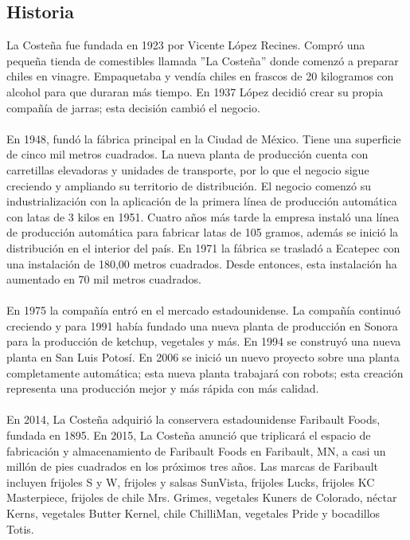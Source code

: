 \documentclass[12pt,letterpaper]{article}
\begin{document}
\subsection{Historia}
La Costeña fue fundada en 1923 por Vicente López Recines. Compró una pequeña tienda de comestibles llamada ''La Costeña'' donde 
comenzó a preparar chiles en vinagre. Empaquetaba y vendía chiles en frascos de 20 kilogramos con alcohol para que duraran más 
tiempo. En 1937 López decidió crear su propia compañía de jarras; esta decisión cambió el negocio. 
\\ \\
En 1948, fundó la fábrica principal en la Ciudad de México. Tiene una superficie de cinco mil metros cuadrados. La nueva planta 
de producción cuenta con carretillas elevadoras y unidades de transporte, por lo que el negocio sigue creciendo y ampliando su 
territorio de distribución. El negocio comenzó su industrialización con la aplicación de la primera línea de producción automática 
con latas de 3 kilos en 1951. Cuatro años más tarde la empresa instaló una línea de producción automática para fabricar latas de 
105 gramos, además se inició la distribución en el interior del país. En 1971 la fábrica se trasladó a Ecatepec con una instalación 
de 180,00 metros cuadrados. Desde entonces, esta instalación ha aumentado en 70 mil metros cuadrados.
\\ \\
En 1975 la compañía entró en el mercado estadounidense. La compañía continuó creciendo y para 1991 había fundado una nueva planta 
de producción en Sonora para la producción de ketchup, vegetales y más. En 1994 se construyó una nueva planta en San Luis Potosí. 
En 2006 se inició un nuevo proyecto sobre una planta completamente automática; esta nueva planta trabajará con robots; esta 
creación representa una producción mejor y más rápida con más calidad.
\\ \\ 
En 2014, La Costeña adquirió la conservera estadounidense Faribault Foods, fundada en 1895. En 2015, La Costeña anunció que triplicará 
el espacio de fabricación y almacenamiento de Faribault Foods en Faribault, MN, a casi un millón de pies cuadrados en los próximos tres 
años. Las marcas de Faribault incluyen frijoles S y W, frijoles y salsas SunVista, frijoles Lucks, frijoles KC Masterpiece, frijoles 
de chile Mrs. Grimes, vegetales Kuners de Colorado, néctar Kerns, vegetales Butter Kernel, chile ChilliMan, vegetales Pride y bocadillos Totis.
\end{document}
